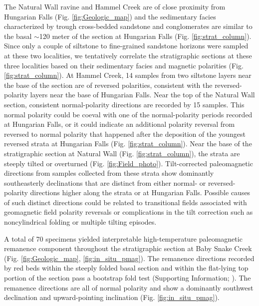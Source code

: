 \documentclass[draft]{agujournal2019}
\begin{document}
The Natural Wall ravine and Hammel Creek are of close proximity from Hungarian Falls (Fig. \ref{fig:Geologic_map}) and the sedimentary facies characterized by trough cross-bedded sandstone and conglomerates are similar to the basal $\sim$120 meter of the section at Hungarian Falls (Fig. \ref{fig:strat_column}). Since only a couple of siltstone to fine-grained sandstone horizons were sampled at these two localities, we tentatively correlate the stratigraphic sections at these three localities based on their sedimentary facies and magnetic polarities (Fig. \ref{fig:strat_column}). At Hammel Creek, 14 samples from two siltstone layers near the base of the section are of reversed polarities, consistent with the reversed-polarity layers near the base of Hungarian Falls. Near the top of the Natural Wall section, consistent normal-polarity directions are recorded by 15 samples. This normal polarity could be coeval with one of the normal-polarity periods recorded at Hungarian Falls, or it could indicate an additional polarity reversal from reversed to normal polarity that happened after the deposition of the youngest reversed strata at Hungarian Falls (Fig. \ref{fig:strat_column}). Near the base of the stratigraphic section at Natural Wall (Fig. \ref{fig:strat_column}), the strata are steeply tilted or overturned (Fig. \ref{fig:Field_photo}). Tilt-corrected paleomagnetic directions from samples collected from these strata show dominantly southeasterly declinations that are distinct from either normal- or reversed-polarity directions higher along the strata or at Hungarian Falls. Possible causes of such distinct directions could be related to transitional fields associated with geomagnetic field polarity reversals or complications in the tilt correction such as noncylindrical folding or multiple tilting episodes. 

A total of 70 specimens yielded interpretable high-temperature paleomagnetic remanence component throughout the stratigraphic section at Baby Snake Creek (Fig. \ref{fig:Geologic_map}, \ref{fig:in_situ_pmag}). The remanence directions recorded by red beds within the steeply folded basal section and within the flat-lying top portion of the section pass a bootstrap fold test (Supporting Information; ). The remanence directions are all of normal polarity and show a dominantly southwest declination and upward-pointing inclination (Fig. \ref{fig:in_situ_pmag}). 
\end{document}
